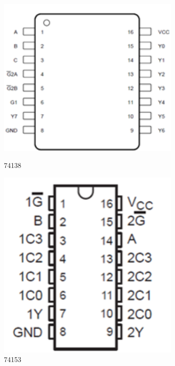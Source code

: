 \documentclass{ctexart}
\begin{document}
\begin{figure}[H]
    \centering
    \begin{minipage}{0.3\textwidth}
    \centering
           \includegraphics[width=0.8\textwidth]{pic/74138.png}
           \caption{74138}
    \label{}
    \end{minipage}
    \hspace{0.05\textwidth}
    \begin{minipage}{0.3\textwidth}
    \centering
           \includegraphics[width=0.8\textwidth]{pic/74153.png}
           \caption{74153}
    \label{}
    \end{minipage}
\end{figure}
\end{document}
